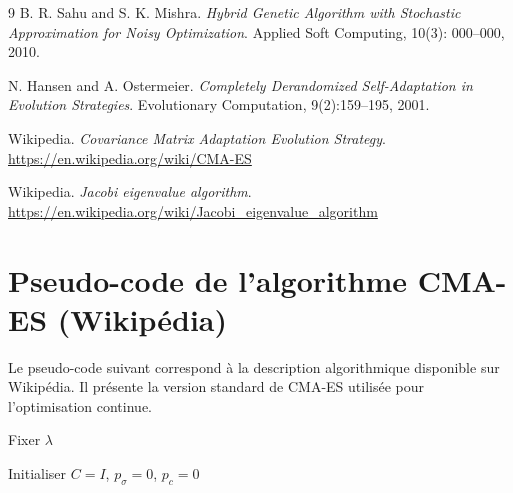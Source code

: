 \documentclass[11pt,a4paper]{article}
\begin{document}
\begin{thebibliography}{9}
B. R. Sahu and S. K. Mishra.
\textit{Hybrid Genetic Algorithm with Stochastic Approximation for Noisy Optimization}.
Applied Soft Computing, 10(3): 000--000, 2010.

N. Hansen and A. Ostermeier.
\textit{Completely Derandomized Self-Adaptation in Evolution Strategies}.
Evolutionary Computation, 9(2):159--195, 2001.

Wikipedia.
\textit{Covariance Matrix Adaptation Evolution Strategy}.
\url{https://en.wikipedia.org/wiki/CMA-ES}

Wikipedia.
\textit{Jacobi eigenvalue algorithm}.
\url{https://en.wikipedia.org/wiki/Jacobi_eigenvalue_algorithm}

\end{thebibliography}
\clearpage

\appendix


\section{Pseudo-code de l’algorithme CMA-ES (Wikipédia)}
\label{annexe:cmaes}

Le pseudo-code suivant correspond à la description algorithmique disponible sur Wikipédia. 
Il présente la version standard de CMA-ES utilisée pour l’optimisation continue.

\begin{algorithm}[H]
\caption{CMA-ES}


Fixer $\lambda$

Initialiser $C = I$, $p_{\sigma} = 0$, $p_c = 0$\;



\end{algorithm}
\end{document}
